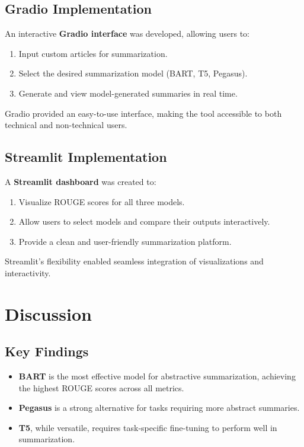 \documentclass[a4paper,12pt]{article}
\begin{document}
\subsection{Gradio Implementation}
An interactive \textbf{Gradio interface} was developed, allowing users to:
\begin{enumerate}
    \item Input custom articles for summarization.
    \item Select the desired summarization model (BART, T5, Pegasus).
    \item Generate and view model-generated summaries in real time.
\end{enumerate}
Gradio provided an easy-to-use interface, making the tool accessible to both technical and non-technical users.

\subsection{Streamlit Implementation}
A \textbf{Streamlit dashboard} was created to:
\begin{enumerate}
    \item Visualize ROUGE scores for all three models.
    \item Allow users to select models and compare their outputs interactively.
    \item Provide a clean and user-friendly summarization platform.
\end{enumerate}
Streamlit's flexibility enabled seamless integration of visualizations and interactivity.

\section{Discussion}
\subsection{Key Findings}
\begin{itemize}
    \item \textbf{BART} is the most effective model for abstractive summarization, achieving the highest ROUGE scores across all metrics.
    \item \textbf{Pegasus} is a strong alternative for tasks requiring more abstract summaries.
    \item \textbf{T5}, while versatile, requires task-specific fine-tuning to perform well in summarization.
\end{itemize}
\end{document}
